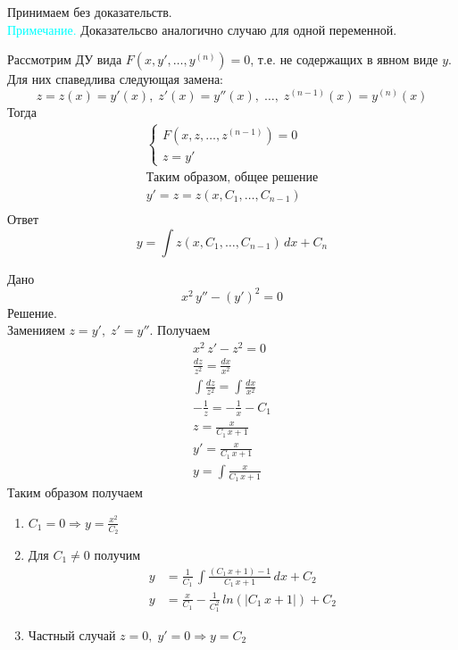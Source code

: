 \begin{Proof}
    Принимаем без доказательств.\\
    \textcolor{cyan}{Примечание.} Доказательсво аналогично случаю для одной переменной.
\end{Proof}

\begin{Note}
    Рассмотрим ДУ вида $F(x, y', \dots, y^{(n)}) = 0$, т.е. не содержащих в явном виде $y$.\\
    Для них спаведлива следующая замена:
    \[
        z = z(x) = y'(x), \; z'(x) = y''(x),\; \dots, \; z^{(n - 1)}(x) = y^{(n)}(x)
    \]
    Тогда
    \begin{align*}
        \begin{cases}   
            F(x, z, \dots, z^{(n-1)}) = 0\\
            z = y'
        \end{cases}\\
        \text{Таким образом, общее решение}\\
        y' = z = z(x, C_1, \dots, C_{n-1})\\
    \end{align*}
    Ответ
    \[
        y = \int z(x, C_1, \dots, C_{n-1})\,dx + C_n
    \]
\end{Note}

\begin{Example}
    Дано
    \[
        x^2\,y'' - (y')^2 = 0
    \]
    Решение.\\
    Заменияем $z = y', \; z' = y''$. Получаем
    \begin{gather*}
        x^2 \, z' - z^2 = 0\\
        \frac{dz}{z^2} = \frac{dx}{x^2}\\
        \int \frac{dz}{z^2} = \int \frac{dx}{x^2}\\
        - \frac{1}{z} = - \frac{1}{x} - C_1\\
        z = \frac{x}{C_1 \, x + 1}\\
        y' = \frac{x}{C_1 \, x + 1}\\
        y = \int \frac{x}{C_1 \, x + 1}
    \end{gather*}
    Таким образом получаем
    \begin{enumerate}
        \item $C_1 = 0 \Rightarrow y = \frac{x^2}{C_2}$
        \item Для $C_1 \neq 0$ получим
        \begin{align*}
            y &= \frac{1}{C_1} \, \int \frac{(C_1\,x + 1) - 1}{C_1\,x + 1} \, dx + C_2\\
            y &= \frac{x}{C_1} - \frac{1}{C_1^2}\,ln(|C_1\,x + 1|)  + C_2
        \end{align*}
        \item Частный случай $z = 0, \; y' = 0 \Rightarrow y = C_2$
    \end{enumerate}
\end{Example}

